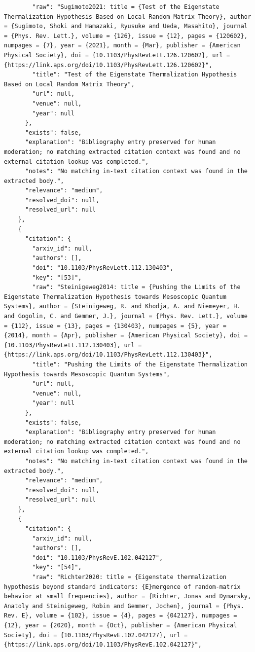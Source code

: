 \documentclass[11pt]{article}
\begin{document}
\begin{verbatim}
        "raw": "Sugimoto2021: title = {Test of the Eigenstate Thermalization Hypothesis Based on Local Random Matrix Theory}, author = {Sugimoto, Shoki and Hamazaki, Ryusuke and Ueda, Masahito}, journal = {Phys. Rev. Lett.}, volume = {126}, issue = {12}, pages = {120602}, numpages = {7}, year = {2021}, month = {Mar}, publisher = {American Physical Society}, doi = {10.1103/PhysRevLett.126.120602}, url = {https://link.aps.org/doi/10.1103/PhysRevLett.126.120602}",
        "title": "Test of the Eigenstate Thermalization Hypothesis Based on Local Random Matrix Theory",
        "url": null,
        "venue": null,
        "year": null
      },
      "exists": false,
      "explanation": "Bibliography entry preserved for human moderation; no matching extracted citation context was found and no external citation lookup was completed.",
      "notes": "No matching in-text citation context was found in the extracted body.",
      "relevance": "medium",
      "resolved_doi": null,
      "resolved_url": null
    },
    {
      "citation": {
        "arxiv_id": null,
        "authors": [],
        "doi": "10.1103/PhysRevLett.112.130403",
        "key": "[53]",
        "raw": "Steinigeweg2014: title = {Pushing the Limits of the Eigenstate Thermalization Hypothesis towards Mesoscopic Quantum Systems}, author = {Steinigeweg, R. and Khodja, A. and Niemeyer, H. and Gogolin, C. and Gemmer, J.}, journal = {Phys. Rev. Lett.}, volume = {112}, issue = {13}, pages = {130403}, numpages = {5}, year = {2014}, month = {Apr}, publisher = {American Physical Society}, doi = {10.1103/PhysRevLett.112.130403}, url = {https://link.aps.org/doi/10.1103/PhysRevLett.112.130403}",
        "title": "Pushing the Limits of the Eigenstate Thermalization Hypothesis towards Mesoscopic Quantum Systems",
        "url": null,
        "venue": null,
        "year": null
      },
      "exists": false,
      "explanation": "Bibliography entry preserved for human moderation; no matching extracted citation context was found and no external citation lookup was completed.",
      "notes": "No matching in-text citation context was found in the extracted body.",
      "relevance": "medium",
      "resolved_doi": null,
      "resolved_url": null
    },
    {
      "citation": {
        "arxiv_id": null,
        "authors": [],
        "doi": "10.1103/PhysRevE.102.042127",
        "key": "[54]",
        "raw": "Richter2020: title = {Eigenstate thermalization hypothesis beyond standard indicators: {E}mergence of random-matrix behavior at small frequencies}, author = {Richter, Jonas and Dymarsky, Anatoly and Steinigeweg, Robin and Gemmer, Jochen}, journal = {Phys. Rev. E}, volume = {102}, issue = {4}, pages = {042127}, numpages = {12}, year = {2020}, month = {Oct}, publisher = {American Physical Society}, doi = {10.1103/PhysRevE.102.042127}, url = {https://link.aps.org/doi/10.1103/PhysRevE.102.042127}",

\end{verbatim}
\end{document}

